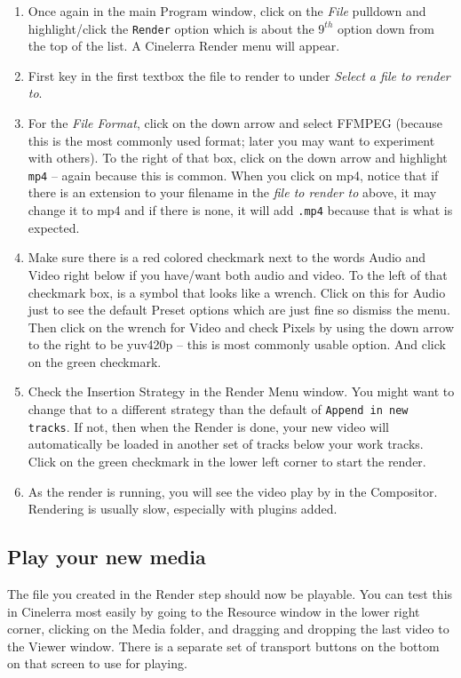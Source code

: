 \begin{enumerate}
	\item Once again in the main Program window, click on the \textit{File} pulldown and highlight/click the \texttt{Render}
	option which is about the $9^{th}$ option down from the top of the list.  A Cinelerra Render menu will
	appear.
	\item First key in the first textbox the file to render to under \textit{Select a file to render to}.
	\item For the \textit{File Format}, click on the down arrow and select FFMPEG (because this is the most
	commonly used format; later you may want to experiment with others).  To the right of that box,
	click on the down arrow and highlight \texttt{mp4} -- again because this is common.  When you click on 
	mp4, notice that if there is an extension to your filename in the \textit{file to render to} above, it may
	change it to mp4 and if there is none, it will add \texttt{.mp4} because that is what is expected.
	\item Make sure there is a red colored checkmark next to the words Audio and Video right below if you
	have/want both audio and video.  To the left of that checkmark box, is a symbol that looks like a
	wrench.  Click on this for Audio just to see the default Preset options which are just fine so dismiss
	the menu.  Then click on the wrench for Video and check Pixels by using the down arrow to the
	right to be yuv420p -- this is most commonly usable option.  And click on the green checkmark.
	\item Check the Insertion Strategy in the Render Menu window.  You might want to change that to
	a different strategy than the default of \texttt{Append in new tracks}.  If not, then when the Render is done,
	your new video will automatically be loaded in another set of tracks below your work tracks.  Click
	on the green checkmark in the lower left corner to start the render.
	\item As the render is running, you will see the video play by in the Compositor.  Rendering is usually
	slow, especially with plugins added.
\end{enumerate}

\subsection{Play your new media}%
\label{sub:play_your_new_media}

The file you created in the Render step should now be playable.  You can test this in Cinelerra most easily by going to the Resource window in the lower right corner, clicking on the Media folder, and dragging and dropping the last video to the Viewer window.  There is a separate set of transport buttons on the bottom on that screen to use for playing.


